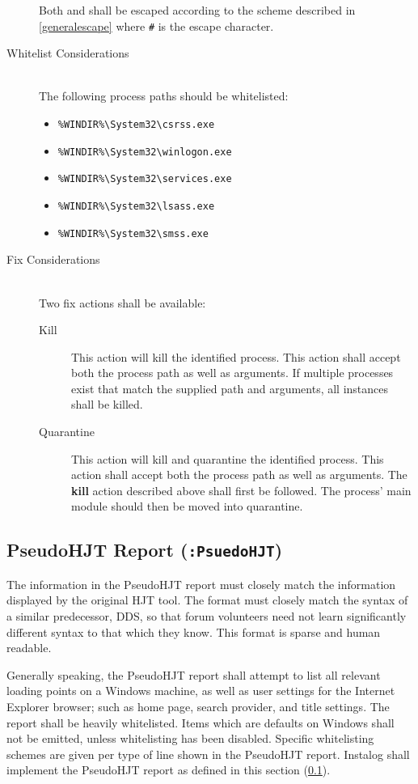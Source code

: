 \begin{description}
Both  and  shall be escaped according to the scheme
described in \ref{generalescape} where \verb|#| is the escape character.
\item[Whitelist Considerations] \hfill \\
The following process paths should be whitelisted:
\begin{itemize}
  \item \verb|%WINDIR%\System32\csrss.exe|
  \item \verb|%WINDIR%\System32\winlogon.exe|
  \item \verb|%WINDIR%\System32\services.exe|
  \item \verb|%WINDIR%\System32\lsass.exe|
  \item \verb|%WINDIR%\System32\smss.exe|
\end{itemize}
\item[Fix Considerations] \hfill \\
Two fix actions shall be available:
\begin{description}
\item[Kill] This action will kill the identified process.  This action shall
accept both the process path as well as arguments.  If multiple processes exist
that match the supplied path and arguments, all instances shall be killed. 
\item[Quarantine]  This action will kill and quarantine the identified
process.  This action shall accept both the process path as well as arguments. 
The \textbf{kill} action described above shall first be followed.  The process'
main module should then be moved into quarantine.
\end{description}
\end{description}

\subsection{PseudoHJT Report (\texttt{:PsuedoHJT})} \label{hjtgeneral}
The information in the PseudoHJT report must closely match the information
displayed by the original HJT tool. The format must closely match the syntax of
a similar predecessor, DDS, so that forum volunteers need not learn
significantly different syntax to that which they know. This format is
sparse and human readable. 

Generally speaking, the PseudoHJT report shall attempt to list all relevant
loading points on a Windows machine, as well as user settings for the Internet
Explorer browser; such as home page, search provider, and title settings. The
report shall be heavily whitelisted. Items which are defaults on Windows shall
not be emitted, unless whitelisting has been disabled. Specific whitelisting
schemes are given per type of line shown in the PseudoHJT report. Instalog shall
implement the PseudoHJT report as defined in this section (\ref{hjtgeneral}).

